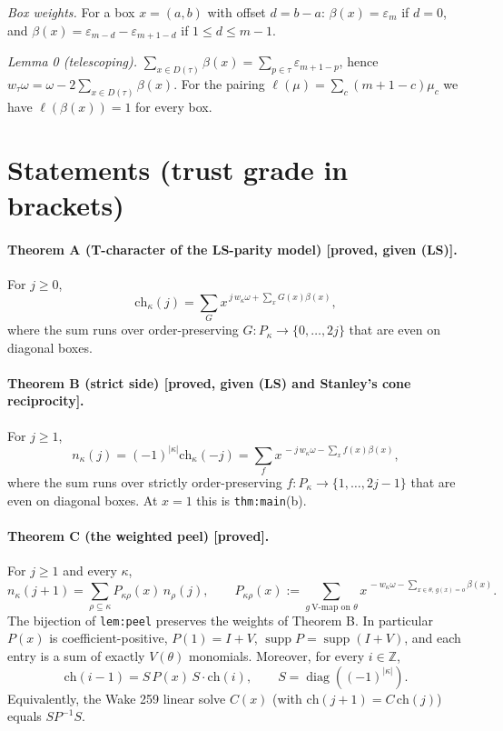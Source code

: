 \documentclass[11pt]{article}
\begin{document}
\emph{Box weights.} For a box $x=(a,b)$ with offset $d=b-a$:
$\beta(x)=\varepsilon_m$ if $d=0$, and $\beta(x)=\varepsilon_{m-d}-\varepsilon_{m+1-d}$ if $1\le d\le m-1$.

\emph{Lemma 0 (telescoping).} $\sum_{x\in D(\tau)}\beta(x)=\sum_{p\in\tau}\varepsilon_{m+1-p}$, hence $w_\tau\omega=\omega-2\sum_{x\in D(\tau)}\beta(x)$. For the pairing $\ell(\mu)=\sum_c(m+1-c)\mu_c$ we have $\ell(\beta(x))=1$ for every box.

\section*{Statements (trust grade in brackets)}

\paragraph{Theorem A (T-character of the LS-parity model) [proved, given (LS)].} For $j\ge0$,
\[
\mathrm{ch}_\kappa(j)=\sum_G x^{\,j\,w_\kappa\omega+\sum_x G(x)\beta(x)},
\]
where the sum runs over order-preserving $G:P_\kappa\to\{0,\dots,2j\}$ that are even on diagonal boxes.

\paragraph{Theorem B (strict side) [proved, given (LS) and Stanley's cone reciprocity].} For $j\ge1$,
\[
n_\kappa(j)=(-1)^{|\kappa|}\mathrm{ch}_\kappa(-j)=\sum_f x^{\,-j\,w_\kappa\omega-\sum_x f(x)\beta(x)},
\]
where the sum runs over strictly order-preserving $f:P_\kappa\to\{1,\dots,2j-1\}$ that are even on diagonal boxes. At $x=1$ this is \texttt{thm:main}(b).

\paragraph{Theorem C (the weighted peel) [proved].} For $j\ge1$ and every $\kappa$,
\[
n_\kappa(j+1)=\sum_{\rho\subseteq\kappa}P_{\kappa\rho}(x)\,n_\rho(j),\qquad
P_{\kappa\rho}(x):=\sum_{g\ \text{V-map on }\theta}x^{\,-w_\kappa\omega-\sum_{x\in\theta,\,g(x)=o}\beta(x)}.
\]
The bijection of \texttt{lem:peel} preserves the weights of Theorem B. In particular $P(x)$ is coefficient-positive, $P(1)=I+V$, $\operatorname{supp}P=\operatorname{supp}(I+V)$, and each entry is a sum of exactly $V(\theta)$ monomials. Moreover, for every $i\in\mathbb{Z}$,
\[
\mathrm{ch}(i-1)=S\,P(x)\,S\cdot\mathrm{ch}(i),\qquad S=\operatorname{diag}((-1)^{|\kappa|}).\tag{$\dagger$}
\]
Equivalently, the Wake 259 linear solve $C(x)$ (with $\mathrm{ch}(j+1)=C\,\mathrm{ch}(j)$) equals $SP^{-1}S$.
\end{document}
